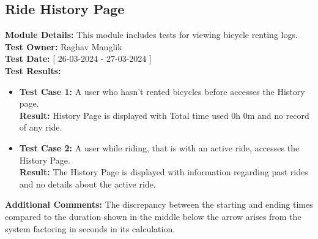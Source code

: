 \documentclass[11pt]{article}
\begin{document}
\subsection{Ride History Page}
\textbf{Module Details: }This module includes tests for viewing bicycle renting logs.
\\
\textbf{Test Owner: }Raghav Manglik
\\
\textbf{Test Date: }[ 26-03-2024 - 27-03-2024 ]
\\
\textbf{Test Results: }
\begin{itemize}
    \item \textbf{Test Case 1: }A user who hasn't rented bicycles before accesses the History page.
    \\
    \textbf{Result: }History Page is displayed with Total time used 0h 0m and no record of any ride.
    \item \textbf{Test Case 2: }A user while riding, that is with an active ride, accesses the History Page.
    \\
    \textbf{Result: }The History Page is displayed with information regarding past rides and no details about the active ride.
\end{itemize}
\textbf{Additional Comments: }The discrepancy between the starting and ending times compared to the duration shown in the middle below the arrow arises from the system factoring in seconds in its calculation.
\end{document}
